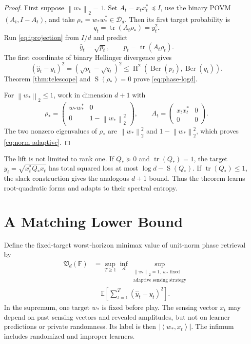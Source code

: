 \documentclass[twoside]{article}
\newcommand{\Dens}{\mathcal D}
\newcommand{\tr}{\operatorname{tr}}
\newcommand{\Hsq}{\operatorname{H}^2}
\newcommand{\Ent}{\operatorname{S}}
\newcommand{\Ber}{\operatorname{Ber}}
\newcommand{\ip}[2]{\left\langle #1,#2\right\rangle}
\newcommand{\norm}[1]{\left\lVert #1\right\rVert}
\begin{document}
\begin{proof}
First suppose $\norm{w_*}_2=1$. Set $A_t=x_tx_t^*\preceq I$, use the binary POVM $(A_t,I-A_t)$, and take $\rho_*=w_*w_*^*\in\Dens_d$. Then its first target probability is
\begin{equation}
q_t=\tr(A_t\rho_*)=y_t^2.
\end{equation}
Run \eqref{eq:iprojection} from $I/d$ and predict
\begin{equation}
\widehat y_t=\sqrt{p_t},\qquad p_t=\tr(A_t\rho_t).
\end{equation}
The first coordinate of binary Hellinger divergence gives
\begin{equation}
(\widehat y_t-y_t)^2=(\sqrt{p_t}-\sqrt{q_t})^2
\leq\Hsq(\Ber(p_t),\Ber(q_t)).
\end{equation}
Theorem \ref{thm:telescope} and $\Ent(\rho_*)=0$ prove \eqref{eq:phase-logd}.

For $\norm{w_*}_2\leq1$, work in dimension $d+1$ with
\begin{equation}
\rho_*=\begin{pmatrix}w_*w_*^*&0\\0&1-\norm{w_*}_2^2\end{pmatrix},
\qquad
A_t=\begin{pmatrix}x_tx_t^*&0\\0&0\end{pmatrix}.
\label{eq:slack-lift}
\end{equation}
The two nonzero eigenvalues of $\rho_*$ are $\norm{w_*}_2^2$ and $1-\norm{w_*}_2^2$, which proves \eqref{eq:norm-adaptive}.
\end{proof}

The lift is not limited to rank one. If $Q_*\succeq0$ and $\tr(Q_*)=1$, the target $y_t=\sqrt{x_t^*Q_*x_t}$ has total squared loss at most $\log d-\Ent(Q_*)$. If $\tr(Q_*)\leq1$, the slack construction gives the analogous $d+1$ bound. Thus the theorem learns root-quadratic forms and adapts to their spectral entropy.

\section{A Matching Lower Bound}
\label{sec:lower}

Define the fixed-target worst-horizon minimax value of unit-norm phase retrieval by
\begin{align}
\mathfrak V_d(\mathbb F)
&=\sup_{T\geq1}\inf_{\mathcal A}\sup_{\substack{\norm{w_*}_2=1,\ w_*\text{ fixed}\\\text{adaptive sensing strategy}}}\nonumber\\
&\quad\mathbb E\!\left[\sum_{t=1}^T(\widehat y_t-y_t)^2\right].
\label{eq:minimax}
\end{align}
In the supremum, one target $w_*$ is fixed before play. The sensing vector $x_t$ may depend on past sensing vectors and revealed amplitudes, but not on learner predictions or private randomness. Its label is then $|\ip{w_*}{x_t}|$. The infimum includes randomized and improper learners.
\end{document}
